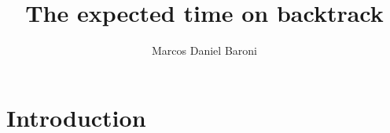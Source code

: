 \documentclass{article}
\title{The expected time on backtrack}
\author{Marcos Daniel Baroni}
\begin{document}
\begin{abstract}
\end{abstract}

\section{Introduction}
\label{intro}




\end{document}
